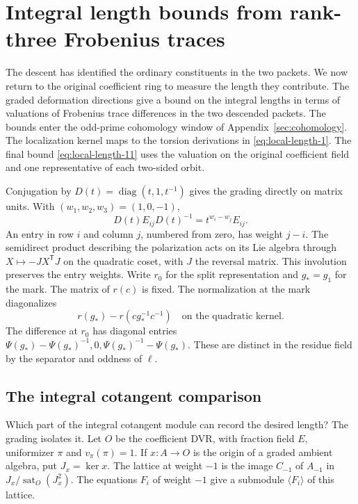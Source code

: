 \section{Integral length bounds from rank-three Frobenius traces}
\label{sec:rank-three-length}
\hypertarget{source-ordinary-rank-three-length}{}

The descent has identified the ordinary constituents in the two packets. We now return
to the original coefficient ring to measure the length they contribute.
The graded deformation directions give a bound on the
integral lengths in terms of valuations of Frobenius trace
differences in the two descended packets. The bounds enter the odd-prime cohomology window of
Appendix~\ref{sec:cohomology}. The localization kernel maps to the torsion derivations in \eqref{eq:local-length-1}. The final bound \eqref{eq:local-length-11} uses the valuation on the original coefficient field and one representative of each two-sided orbit.

Conjugation by \(D(t)=\operatorname{diag}(t,1,t^{-1})\) gives the grading directly on matrix units. With \((w_1,w_2,w_3)=(1,0,-1)\),
\[
 D(t)E_{ij}D(t)^{-1}=t^{w_i-w_j}E_{ij}.
\] An entry in row \(i\)
and column \(j\), numbered from zero, has weight \(j-i\).
The semidirect product describing the polarization acts on its
Lie algebra through \(X\mapsto-JX^{\mathsf T}J\) on the
quadratic coset, with \(J\) the reversal matrix. This
involution preserves the entry weights. Write \(r_0\) for the
split representation and \(g_*=g_1\) for the mark. The
matrix of \(r(c)\) is fixed. The normalization at the mark
diagonalizes
\[
              r(g_*)-r(cg_*^{-1}c^{-1})
              \quad\text{on the quadratic kernel.}
\]
The difference at \(r_0\) has
diagonal entries \(\Psi(g_*)-\Psi(g_*)^{-1},0,
\Psi(g_*)^{-1}-\Psi(g_*)\). These are distinct in the residue
field by the separator and oddness of \(\ell\).

\subsection{The integral cotangent comparison}

Which part of the integral cotangent module can record the desired length? The grading
isolates it. Let \(O\) be the coefficient DVR, with fraction field \(E\),
uniformizer \(\pi\) and \(v_\pi(\pi)=1\). If \(x:A\to O\) is
the origin of a graded ambient algebra, put \(J_x=\ker x\).
The lattice at weight \(-1\) is the image \(C_{-1}\) of
\(A_{-1}\) in \(J_x/\operatorname{sat}_O(J_x^2)\). The
equations \(F_i\) of weight \(-1\) give a submodule
\(\langle F_i\rangle\) of this lattice.

